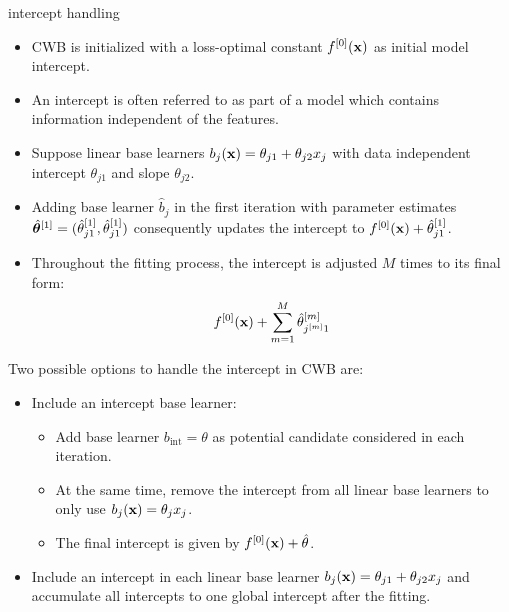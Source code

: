 \documentclass[11pt,compress,t,notes=noshow, xcolor=table]{beamer}
\begin{document}
\begin{vbframe}{intercept handling}

\begin{itemize}
  \item CWB is initialized with a loss-optimal constant $f^{[0]}(\mathbf{x})$ as initial model intercept.
  \item An intercept is often referred to as part of a model which contains information independent of the features.
  \item Suppose linear base learners $b_j(\mathbf{x}) = \theta_{j1} + \theta_{j2} x_j$ with data independent intercept $\theta_{j1}$ and slope $\theta_{j2}$.
  \item Adding base learner $\hat{b}_j$ in the first iteration with parameter estimates $\hat{\bm{\theta}}^{[1]} = (\hat{\theta}_{j1}^{[1]}, \hat{\theta}_{j1}^{[1]})$ consequently updates the intercept to $f^{[0]}(\mathbf{x}) + \hat{\theta}_{j1}^{[1]}$.
  \item Throughout the fitting process, the intercept is adjusted $M$ times to its final form:
    $$
    f^{[0]}(\mathbf{x}) + \sum\limits_{m=1}^M \hat{\theta}^{[m]}_{j^{[m]}1}
    $$
\end{itemize}

\framebreak

Two possible options to handle the intercept in CWB are:

\begin{itemize}

\item Include an intercept base learner:
  \begin{itemize}
    \item Add base learner $b_{\text{int}} = \theta$ as potential candidate considered in each iteration.
    \item At the same time, remove the intercept from all linear base learners to only use $b_j(\mathbf{x}) = \theta_j x_j$.
    \item The final intercept is given by $f^{[0]}(\mathbf{x}) + \hat{\theta}$.
  \end{itemize}
  \item Include an intercept in each linear base learner $b_j(\mathbf{x}) = \theta_{j1} + \theta_{j2} x_j$ and accumulate all intercepts to one global intercept after the fitting.

\end{itemize}



\end{vbframe}
\end{document}
